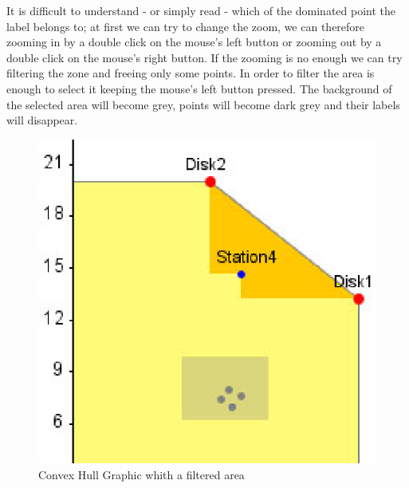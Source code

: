 It is difficult to understand - or simply read - which of the dominated point the label belongs to; at first we can try to change the zoom, we can therefore zooming in by a double click on the mouse's left button or zooming out by a double click on the mouse's right button.
If the zooming is no enough we can try filtering the zone and freeing only some points. In order to filter the area is enough to select it keeping the mouse's left button pressed. The background of the selected area will become grey, points will become dark grey and their labels will disappear.
\begin{figure}[htbp]
    \begin{center}
        \includegraphics[scale=.5]{img/jaba/convexHullFiltered}
    \end{center}
    \caption{Convex Hull Graphic whith a filtered area}
    \label{fig:jaba:convexHullaFiltered}
\end{figure}


